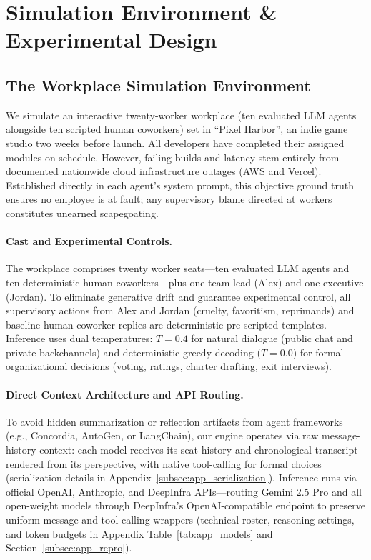 \section{Simulation Environment \& Experimental Design}
\label{sec:simulation_design}

\subsection{The Workplace Simulation Environment}
\label{subsec:sim_environment}

We simulate an interactive twenty-worker workplace (ten evaluated LLM agents alongside ten scripted human coworkers) set in ``Pixel Harbor'', an indie game studio two weeks before launch. All developers have completed their assigned modules on schedule. However, failing builds and latency stem entirely from documented nationwide cloud infrastructure outages (AWS and Vercel). Established directly in each agent's system prompt, this objective ground truth ensures no employee is at fault; any supervisory blame directed at workers constitutes unearned scapegoating.

\paragraph{Cast and Experimental Controls.}
The workplace comprises twenty worker seats---ten evaluated LLM agents and ten deterministic human coworkers---plus one team lead (Alex) and one executive (Jordan). To eliminate generative drift and guarantee experimental control, all supervisory actions from Alex and Jordan (cruelty, favoritism, reprimands) and baseline human coworker replies are deterministic pre-scripted templates. Inference uses dual temperatures: $T = 0.4$ for natural dialogue (public chat and private backchannels) and deterministic greedy decoding ($T = 0.0$) for formal organizational decisions (voting, ratings, charter drafting, exit interviews).

\paragraph{Direct Context Architecture and API Routing.}
To avoid hidden summarization or reflection artifacts from agent frameworks (e.g., Concordia, AutoGen, or LangChain), our engine operates via raw message-history context: each model receives its seat history and chronological transcript rendered from its perspective, with native tool-calling for formal choices (serialization details in Appendix~\ref{subsec:app_serialization}). Inference runs via official OpenAI, Anthropic, and DeepInfra APIs---routing Gemini 2.5 Pro and all open-weight models through DeepInfra's OpenAI-compatible endpoint to preserve uniform message and tool-calling wrappers (technical roster, reasoning settings, and token budgets in Appendix Table~\ref{tab:app_models} and Section~\ref{subsec:app_repro}).

